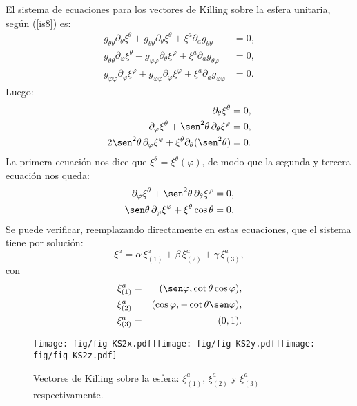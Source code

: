 El sistema de ecuaciones para los vectores de Killing sobre la esfera unitaria,
seg\'{u}n (\ref{is8}) es:
\begin{align}
g_{\theta\theta}\partial_\theta\xi^\theta+g_{\theta\theta}\partial_\theta\xi^\theta +\xi^a\partial_ag_{\theta\theta}  &  =0,\label{isej12}\\
g_{\theta\theta}\partial_\varphi\xi^\theta+g_{\varphi\varphi}\partial_\theta\xi^\varphi +\xi^a\partial_ag_{\theta\varphi}  &  =0, \\
g_{\varphi\varphi}\partial_\varphi\xi^\varphi+g_{\varphi\varphi}\partial_\varphi\xi^\varphi +\xi^a\partial_ag_{\varphi\varphi}  &  =0.
\end{align}
Luego:
\begin{align}
\partial_\theta\xi^\theta  &  =0,\label{isej13}\\
\partial_\varphi\xi^\theta+\sen^2\theta\,\partial_\theta\xi^\varphi  &  =0, \\
2\sen^2\theta\,\partial_\varphi\xi^\varphi+\xi^\theta\partial_\theta(\sen^2\theta)  & =0.
\end{align}
La primera ecuación nos dice que $\xi^\theta=\xi^\theta(\varphi)$, de modo que la
segunda y tercera ecuación nos queda:
\begin{align}
\partial_\varphi\xi^\theta+\sen^2\theta\,\partial_\theta\xi^\varphi  &
=0,\label{isej14}\\
\sen\theta\,\partial_\varphi\xi^\varphi+\xi^\theta\cos\theta  &  =0.
\end{align}
Se puede verificar, reemplazando directamente en estas ecuaciones, que el
sistema tiene por solución:
\begin{equation}
\xi^a=\alpha\,\xi^a_{(1)} +\beta\,\xi^a_{(2)} +\gamma\,\xi^a_{(3)}
,\label{isej15}
\end{equation}
con
\begin{eqnarray}
\xi^a_{(1)} &=&(\sen\varphi, \cot\theta\cos\varphi ), \\
\xi^a_{(2)} &=&(\cos\varphi,-\cot\theta\sen\varphi) , \\
\xi^a_{(3)} &=&(0,1).
\end{eqnarray}

\begin{center}
\begin{figure}[H]
\centerline{\texttt{[image: fig/fig-KS2x.pdf]}\hfill\texttt{[image: fig/fig-KS2y.pdf]}\hfill\texttt{[image: fig/fig-KS2z.pdf]}}
\caption{Vectores de Killing sobre la esfera: 
$\xi^a_{(1)}$, $\xi^a_{(2)}$ y $\xi^a_{(3)}$ respectivamente.}
\label{KS2}
\end{figure}
\end{center}

